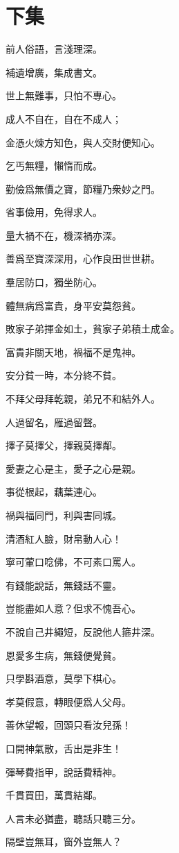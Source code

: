 \documentclass[12pt,a4paper]{ctexbook}
\begin{document}
\section{下集}
前人俗語，言淺理深。\par
補遺增廣，集成書文。\par
世上無難事，只怕不專心。\par
成人不自在，自在不成人；\par
金憑火煉方知色，與人交財便知心。\par
乞丐無糧，懶惰而成。\par
勤儉爲無價之寶，節糧乃衆妙之門。\par
省事儉用，免得求人。\par
量大禍不在，機深禍亦深。\par
善爲至寶深深用，心作良田世世耕。\par
羣居防口，獨坐防心。\par
體無病爲富貴，身平安莫怨貧。\par
敗家子弟揮金如土，貧家子弟積土成金。\par
富貴非關天地，禍福不是鬼神。\par
安分貧一時，本分終不貧。\par
不拜父母拜乾親，弟兄不和結外人。\par
人過留名，雁過留聲。\par
擇子莫擇父，擇親莫擇鄰。\par
愛妻之心是主，愛子之心是親。\par
事從根起，藕葉連心。\par
禍與福同門，利與害同城。\par
清酒紅人臉，財帛動人心！\par
寧可葷口唸佛，不可素口罵人。\par
有錢能說話，無錢話不靈。\par
豈能盡如人意？但求不愧吾心。\par
不說自己井繩短，反說他人箍井深。\par
恩愛多生病，無錢便覺貧。\par
只學斟酒意，莫學下棋心。\par
孝莫假意，轉眼便爲人父母。\par
善休望報，回頭只看汝兒孫！\par
口開神氣散，舌出是非生！\par
彈琴費指甲，說話費精神。\par
千貫買田，萬貫結鄰。\par
人言未必猶盡，聽話只聽三分。\par
隔壁豈無耳，窗外豈無人？\par
\end{document}
